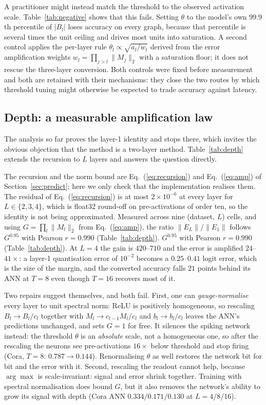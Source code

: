 \documentclass[10pt,twocolumn]{article}
\newcommand{\tabref}[1]{Table~\ref{#1}}
\newcommand{\secref}[1]{Section~\ref{#1}}
\newcommand{\eqnref}[1]{Eq.~(\ref{#1})}
\begin{document}
A practitioner might instead match the threshold to the observed activation scale.
\tabref{tab:negative} shows that this fails. Setting $\theta$ to the model's own $99.9$th percentile
of $|B_l|$ loses accuracy on every graph, because that percentile is several times the unit ceiling
and drives most units into saturation. A second control applies the per-layer rule
$\theta_l\propto\sqrt{a_l/w_l}$ derived from the error amplification weights
$w_l=\prod_{j>l}\lVert M_j\rVert_{2}$ with a saturation floor; it does not rescue the three-layer
conversion. Both controls were fixed before measurement and both are retained with their mechanisms:
they close the two routes by which threshold tuning might otherwise be expected to trade accuracy
against latency.

\subsection{Depth: a measurable amplification law}
\label{sec:depth}

The analysis so far proves the layer-1 identity and stops there, which invites the obvious
objection that the method is a two-layer method. \tabref{tab:depth} extends the recursion to $L$
layers and answers the question directly.

The recursion and the norm bound are \eqnref{eq:recursion} and \eqnref{eq:amp} of
\secref{sec:predict}; here we only check that the implementation realises them. The residual
of \eqnref{eq:recursion} is at most $2\times10^{-6}$ at every layer for $L\in\{2,3,4\}$, which
is float32 round-off on pre-activations of order ten, so the identity is not being approximated.
Measured across nine (dataset, $L$) cells, and using $G=\prod_{l}\lVert M_{l}\rVert_{2}$ from \eqnref{eq:amp}, the ratio $\lVert E_{L}\rVert/\lVert E_{1}\rVert$ follows $G^{0.95}$ with
Pearson $r=0.990$ (\tabref{tab:depth}).
$G^{0.95}$ with Pearson $r=0.990$ (\tabref{tab:depth}). At $L=4$ the gain is $420$--$710$ and the
error is amplified $24$--$41\times$: a layer-1 quantisation error of $10^{-2}$ becomes a
$0.25$--$0.41$ logit error, which is the size of the margin, and the converted accuracy falls $21$
points behind its ANN at $T=8$ even though $T=16$ recovers most of it.

Two repairs suggest themselves, and both fail. First, one can \emph{gauge-normalise} every layer to
unit spectral norm: ReLU is positively homogeneous, so rescaling
$B_{l}\to B_{l}/c_{l}$ together with $M_{l}\to c_{l-1}M_{l}/c_{l}$ and $b_{l}\to b_{l}/c_{l}$ leaves
the ANN's predictions unchanged, and sets $G=1$ for free. It silences the spiking network instead:
the threshold $\theta$ is an \emph{absolute} scale, not a homogeneous one, so after the rescaling
the neurons see pre-activations $16\times$ below threshold and stop firing (Cora, $T=8$: $0.787\to
0.144$). Renormalising $\theta$ as well restores the network bit for bit and the error with it.
Second, rescaling the readout cannot help, because $\arg\max$ is scale-invariant: signal and error
shrink together. Training with spectral normalisation does bound $G$, but it also removes the
network's ability to grow its signal with depth (Cora ANN $0.334/0.171/0.130$ at
$L=4/8/16$).
\end{document}
